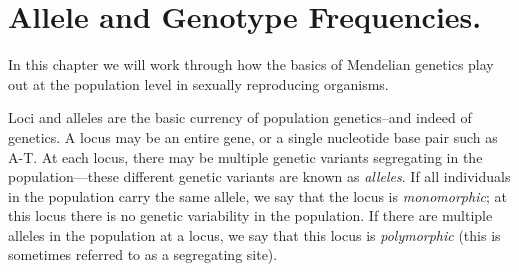 

\usepackage{nicefrac}

\chapter{Allele and Genotype Frequencies.}
 In this chapter we will
work through how the basics of Mendelian genetics play out at the population
level in sexually reproducing organisms.

	Loci and alleles are the basic currency of population genetics--and indeed of
genetics.  A locus
may be an entire gene, or a single nucleotide base pair such as A-T. At each
locus, there may be multiple genetic variants segregating in the
population---these different genetic variants are known as \emph{alleles}. If
all individuals in the population carry the same allele, we say that the locus
is \emph{monomorphic}; at this locus there is no genetic variability in the
population. If there are multiple alleles in the population at a locus, we say
that this locus is \emph{polymorphic} (this is sometimes referred to
as a segregating site).

